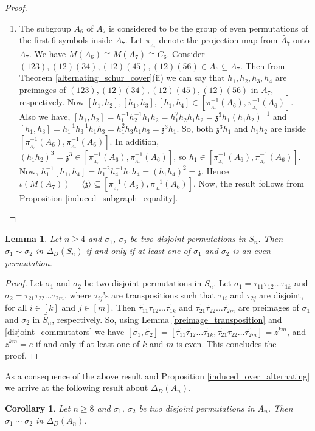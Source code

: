\documentclass[12pt,a4paper]{article}
\newtheorem{lemma}[theorem]{Lemma}
\newtheorem{corollary}[theorem]{Corollary}
\begin{document}
\begin{proof}
\begin{enumerate}[\rm (i)]
     \item The subgroup $A_6$ of $A_7$ is considered to be the group of even permutations of the first $6$ symbols inside $A_7$. Let $\pi_{_{A_7}}$ denote the projection map from $\tilde{A_7}$ onto $A_7$. We have $M(A_6)\cong M(A_7)\cong C_6$. Consider $(123),(12)(34),(12)(45),(12)(56)\in A_6\subseteq A_7$. Then from Theorem \ref{alternating_schur_cover}(ii) we can say that $h_1,h_2,h_3,h_4$ are preimages of $(123),(12)(34),(12)(45),(12)(56)$ in $A_7$, respectively. Now $[h_1,h_2],[h_1,h_3],[h_1,h_4]\in[\pi_{_{A_7}}^{-1}(A_6),\pi_{_{A_7}}^{-1}(A_6)]$. Also we have, $[h_1,h_2]=h_1^{-1}h_2^{-1}h_1h_2=h_1^2h_2h_1h_2=\mathfrak{z}^3h_1(h_1h_2)^{-1}$ and $[h_1,h_3]=h_1^{-1}h_3^{-1}h_1h_3=h_1^2h_3h_1h_3=\mathfrak{z}^3h_1$. So, both $\mathfrak{z}^3h_1$ and $h_1h_2$ are inside $[\pi_{_{A_7}}^{-1}(A_6),\pi_{_{A_7}}^{-1}(A_6)].$ In addition, $(h_1h_2)^3=\mathfrak{z}^3\in[\pi_{_{A_7}}^{-1}(A_6),\pi_{_{A_7}}^{-1}(A_6)]$, so $h_1\in[\pi_{_{A_7}}^{-1}(A_6),\pi_{_{A_7}}^{-1}(A_6)]$. Now, $h_1^{-1}[h_1,h_4]=h_1^{-2}h_4^{-1}h_1h_4=(h_1h_4)^2=\mathfrak{z}$. Hence $\iota(M(A_7))=\langle\mathfrak{z}\rangle\subseteq[\pi_{_{A_7}}^{-1}(A_6),\pi_{_{A_7}}^{-1}(A_6)]$. Now, the result follows from Proposition \ref{induced_subgraph_equality}. 
\end{enumerate}
\end{proof}

\begin{lemma}\label{disjoint_permutations_in_Sn}
Let $n\geq 4$ and $\sigma_1$, $\sigma_2$ be two disjoint permutations in $S_n$. Then $\sigma_1\sim\sigma_2$ in $\Delta_D(S_n)$ if and only if at least one of $\sigma_1$ and $\sigma_2$ is an even permutation.  
\end{lemma}
\begin{proof}
Let $\sigma_1$ and $\sigma_2$ be two disjoint permutations in $S_n$. Let $\sigma_1=\tau_{11}\tau_{12}\dots\tau_{1k}$ and $\sigma_2=\tau_{21}\tau_{22}\dots\tau_{2m}$, where $\tau_{ij}$'s are transpositions such that $\tau_{1i}$ and $\tau_{2j}$ are disjoint, for all $i\in [k]$ and $j\in [m]$. Then $\tilde{\tau_{11}}\tilde{\tau_{12}}\dots\tilde{\tau_{1k}}$ and $\tilde{\tau_{21}}\tilde{\tau_{22}}\dots\tilde{\tau_{2m}}$ are preimages of $\sigma_1$ and $\sigma_2$ in $\tilde{S_n}$, respectively. So, using Lemma \ref{preimage_transposition} and \ref{disjoint_commutators} we have $[\tilde{\sigma_1},\tilde{\sigma_2}]=[\tilde{\tau_{11}}\tilde{\tau_{12}}\dots\tilde{\tau_{1k}},\tilde{\tau_{21}}\tilde{\tau_{22}}\dots\tilde{\tau_{2m}}]=z^{km}$, and $z^{km}=e$ if and only if at least one of $k$ and $m$ is even. This concludes the proof. 
\end{proof}
As a consequence of the above result and Proposition \ref{induced_over_alternating} we arrive at the following result about $\Delta_D(A_n)$.
\begin{corollary}\label{disjoint_permutations_in_An}
Let $n\geq 8$ and $\sigma_1$, $\sigma_2$ be two disjoint permutations in $A_n$. Then $\sigma_1\sim\sigma_2$ in $\Delta_D(A_n)$.    
\end{corollary}
\end{document}
